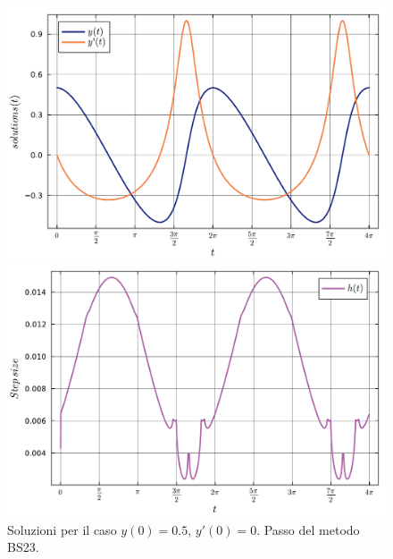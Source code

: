 \documentclass[letterpaper, 12pt]{article}
\numberwithin{equation}{section}    %
\begin{document}
\begin{figure}[!ht]
    \centering
    \begin{minipage}[b]{0.40\textwidth}
        \includegraphics[width=\textwidth]{6363.pdf}
    \end{minipage}
    \hspace{0.5cm}
    \begin{minipage}[b]{0.40\textwidth}
        \includegraphics[width=\textwidth]{6364.pdf}
    \end{minipage}
    \caption{Soluzioni per il caso $y(0) = 0.5$, $y'(0) = 0$. Passo del metodo BS23.}
    \label{fig:es6_3_6_2}
\end{figure}
\end{document}
